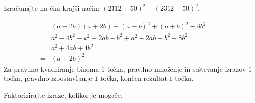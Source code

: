 \documentclass[addpoints]{exam}
\begin{document}
\begin{questions}
        \question[3]
        Izračunajte na čim krajši način: $(2312+50)^2-(2312-50)^2$.   
    
        \begin{solution}[8.5cm]
            \begin{align*}
                &(a-2b)(a+2b)-(a-b)^2+(a+b)^2+8b^2= \\
                =&a^2-4b^2-a^2+2ab-b^2+a^2+2ab+b^2+8b^2= \\
                =&a^2+4ab+4b^2= \\
                =&(a+2b)^2
            \end{align*}
            Za pravilno kvadriranje binoma $1$ točka, pravilno množenje in seštevanje izrazov $1$ točka, pravilno izpostavljanje $1$ točka, končen rezultat $1$ točka.
        \end{solution}
    

    \question
    Faktorizirajte izraze, kolikor je mogoče.
\end{questions}
\end{document}
